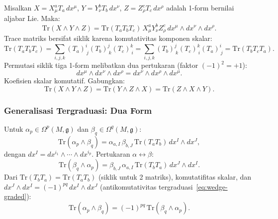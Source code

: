 Misalkan $X = X^a_\mu T_a\,dx^\mu$, $Y = Y^b_\nu T_b\,dx^\nu$, $Z = Z^c_\rho T_c\,dx^\rho$ adalah 1-form bernilai aljabar Lie. Maka:
\begin{equation}
    \mathrm{Tr}(X \wedge Y \wedge Z) = \mathrm{Tr}(T_a T_b T_c)\,X^a_\mu Y^b_\nu Z^c_\rho\,dx^\mu \wedge dx^\nu \wedge dx^\rho.
\end{equation}
Trace matriks bersifat siklik karena komutativitas komponen skalar:
\begin{equation}
    \mathrm{Tr}(T_a T_b T_c) = \sum_{i,j,k}(T_a)^i_{\ j}(T_b)^j_{\ k}(T_c)^k_{\ i} = \sum_{i,j,k}(T_b)^j_{\ k}(T_c)^k_{\ i}(T_a)^i_{\ j} = \mathrm{Tr}(T_b T_c T_a).
\end{equation}
Permutasi siklik tiga 1-form melibatkan dua pertukaran (faktor $(-1)^2 = +1$):
\begin{equation}
    dx^\mu \wedge dx^\nu \wedge dx^\rho = dx^\nu \wedge dx^\rho \wedge dx^\mu.
\end{equation}
Koefisien skalar komutatif. Gabungkan:
\begin{equation}\label{app-ct-eq:cyclic-1forms}
    \mathrm{Tr}(X \wedge Y \wedge Z) = \mathrm{Tr}(Y \wedge Z \wedge X) = \mathrm{Tr}(Z \wedge X \wedge Y).
\end{equation}
 
\subsubsection{Generalisasi Tergraduasi: Dua Form}
 
Untuk $\alpha_p \in \Omega^p(M,\mathfrak{g})$ dan $\beta_q \in \Omega^q(M,\mathfrak{g})$:
\begin{equation}
    \mathrm{Tr}(\alpha_p \wedge \beta_q) = \alpha_{a,I}\,\beta_{b,J}\,\mathrm{Tr}(T_a T_b)\,dx^I \wedge dx^J,
\end{equation}
dengan $dx^I = dx^{i_1} \wedge \cdots \wedge dx^{i_p}$. Pertukaran $\alpha \leftrightarrow \beta$:
\begin{equation}
    \mathrm{Tr}(\beta_q \wedge \alpha_p) = \beta_{b,J}\,\alpha_{a,I}\,\mathrm{Tr}(T_b T_a)\,dx^J \wedge dx^I.
\end{equation}
Dari $\mathrm{Tr}(T_b T_a) = \mathrm{Tr}(T_a T_b)$ (siklik untuk 2 matriks), komutatifitas skalar, dan $dx^J \wedge dx^I = (-1)^{pq}\,dx^I \wedge dx^J$ (antikomutativitas tergraduasi~\eqref{eq:wedge-graded}):
\begin{equation}\label{app-ct-eq:graded-2forms}
    \mathrm{Tr}(\alpha_p \wedge \beta_q) = (-1)^{pq}\,\mathrm{Tr}(\beta_q \wedge \alpha_p).
\end{equation}
 
